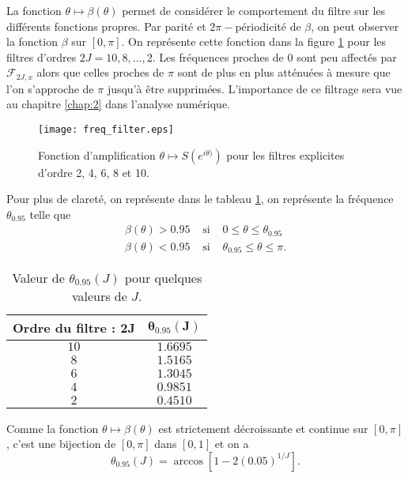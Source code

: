 La fonction $\theta \mapsto \beta(\theta)$ permet de considérer le comportement du filtre sur les différents fonctions propres. Par parité et $2 \pi -$périodicité de $\beta$, on peut observer la fonction $\beta$ sur $[0,\pi]$. On représente cette fonction dans la figure \ref{fig:freq_filter} pour les filtres d'ordres $2J = 10, 8, ..., 2$. Les fréquences proches de 0 sont peu affectés par $\mathcal{F}_{2J,x}$ alors que celles proches de $\pi$ sont de plus en plus atténuées à mesure que l'on s'approche de $\pi$ jusqu'à être supprimées. L'importance de ce filtrage sera vue au chapitre \ref{chap:2} dans l'analyse numérique.

\begin{figure}[htbp]
\begin{center}
\texttt{[image: freq\_filter.eps]}
\end{center}
\caption{Fonction d'amplification $\theta \mapsto S(e^{i\theta)})$ pour les filtres explicites d'ordre 2, 4, 6, 8 et 10.}
\label{fig:freq_filter}
\end{figure}
Pour plus de clareté, on représente dans le tableau \ref{tab:filter_095}, on représente la fréquence $\theta_{0.95}$ telle que
\begin{equation}
\begin{array}{rcl}
\beta(\theta) > 0.95 & \text{ si } & 0 \leq \theta \leq \theta_{0.95} \\
\beta(\theta) < 0.95 & \text{ si } & \theta_{0.95} \leq \theta \leq \pi.
\end{array}
\end{equation}

\begin{table}
\begin{center}
\begin{tabular}{|c||c|}
\hline
\textbf{Ordre du filtre : }$\mathbf{2J}$ & $\mathbf{\theta_{0.95}(J)}$\\
\hline
\hline
$10$&$1.6695$\\
$8$&$1.5165$\\
$6$&$1.3045$\\
$4$&$0.9851$\\
$2$&$0.4510$\\
\hline
\end{tabular}
\end{center}
\caption{Valeur de $\theta_{0.95}(J)$ pour quelques valeurs de $J$.}
\label{tab:filter_095}
\end{table}

Comme la fonction $\theta \mapsto \beta(\theta)$ est strictement décroissante et continue sur $[0,\pi]$, c'est une bijection de $[0,\pi]$ dans $[0,1]$ et on a 
\begin{equation}
\theta_{0.95}(J) = \arccos \left[ 1-2 (0.05)^{1/J} \right].
\end{equation}



